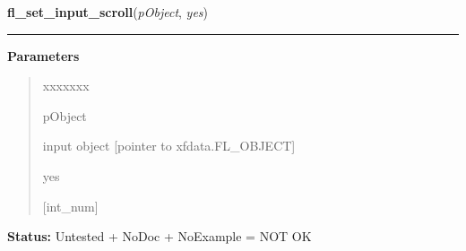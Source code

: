 \hspace{.8\funcindent}\begin{boxedminipage}{\funcwidth}

    \raggedright \textbf{fl\_set\_input\_scroll}(\textit{pObject}, \textit{yes})

    \vspace{-1.5ex}

    \rule{\textwidth}{0.5\fboxrule}
\setlength{\parskip}{2ex}
\setlength{\parskip}{1ex}
      \textbf{Parameters}
      \vspace{-1ex}

      \begin{quote}
        \begin{Ventry}{xxxxxxx}

          \item[pObject]

          input object [pointer to xfdata.FL\_OBJECT]

          \item[yes]

          [int\_num]

        \end{Ventry}

      \end{quote}

\textbf{Status:} Untested + NoDoc + NoExample = NOT OK



    \end{boxedminipage}

    \label{xformslib:library:fl_set_input_cursorpos}

    \vspace{0.5ex}

